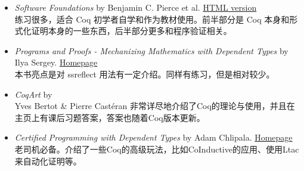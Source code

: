 \begin{itemize}
    \item \emph{Software Foundations} by Benjamin C. Pierce et al.
          \href{https://www.cis.upenn.edu/~bcpierce/sf/current/index.html}{HTML version}\\
          练习很多，适合 Coq 初学者自学和作为教材使用。前半部分是 Coq 本身和形式化证明本身的一些东西，后半部分更多和程序验证相关。
    \item \emph{Programs and Proofs - Mechanizing Mathematics with Dependent Types} by Ilya Sergey.
          \href{http://ilyasergey.net/pnp}{Homepage}\\
          本书亮点是对 ssreflect 用法有一定介绍。同样有练习，但是相对较少。
    \item \emph{CoqArt} by
          \href{https://www.labri.fr/perso/casteran/CoqArt/}\\ Yves Bertot & Pierre Castéran
          非常详尽地介绍了Coq的理论与使用，并且在主页上有课后习题答案，答案也随着Coq版本更新。
    \item \emph{Certified Programming with Dependent Types} by Adam Chlipala.
          \href{http://adam.chlipala.net/cpdt/}{Homepage}\\
          老司机必备。介绍了一些Coq的高级玩法，比如CoInductive的应用、使用Ltac来自动化证明等。
\end{itemize}
